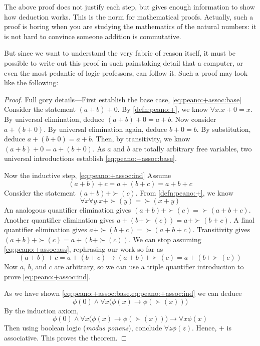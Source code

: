 \documentclass{scrbook}
\renewcommand{\implies}{\to}
\begin{document}
The above proof does not justify each step, but gives enough information to show how deduction works. This is the norm for mathematical proofs. Actually, such a proof is boring when you are studying the mathematics of the natural numbers: it is not hard to convince someone addition is commutative. 

But since we want to understand the very fabric of reason itself, it must be possible to write out this proof in such painstaking detail that a computer, or even the most pedantic of logic professors, can follow it. Such a proof may look like the following: 

\begin{proof}
  Full gory details---First establish the base case, \cref{eq:peano:+assoc:base}
  Consider the statement $(a+b)+0$. By \cref{defn:peano:+}, we know $\forall x . x+0=x$. By universal elimination, deduce $(a+b)+0=a+b$. Now consider
  $a+(b+0)$. By universal elimination again, deduce $b+0=b$. By substitution, deduce $a+(b+0)=a+b$. Then, by transitivity, we know $(a+b)+0=a+(b+0)$. As $a$ and $b$ are totally arbitrary free variables, two universal introductions establish \cref{eq:peano:+assoc:base}.

  Now the inductive step, \cref{eq:peano:+assoc:ind}
  Assume \begin{equation}(a+b)+c=a+(b+c)=a+b+c\label{eq:peano:+assoc:ass}\end{equation}
  Consider the statement $(a+b)+\succ (c)$. From \cref{defn:peano:+}, we know
  \[\forall x \forall y . x+\succ(y)=\succ(x+y)\]
  An analogous quantifier elimination gives $(a+b)+\succ (c) = \succ(a+b+c)$. 
  Another quantifier elimination gives $a+(b+\succ(c))= a+\succ(b+c)$. A final quantifier elimination gives $a+\succ(b+c)=\succ(a+b+c)$. Transitivity gives $(a+b)+\succ(c)=a+(b+\succ(c))$. We can stop assuming \cref{eq:peano:+assoc:ass}, rephrasing our work so far as
  \[
  (a+b)+c=a+(b+c)\implies (a+b)+\succ(c) = a+(b+\succ (c))
  \]
  Now $a$, $b$, and $c$ are arbitrary, so we can use a triple quantifier introduction to prove \cref{eq:peano:+assoc:ind}. 

  As we have shown \cref{eq:peano:+assoc:base,eq:peano:+assoc:ind} we can deduce 
  \begin{equation}
    \label{eq:peano:+assoc:both}
    \phi(0)\wedge \forall x \bigl(\phi(x)\implies \phi(\succ(x))\bigr)
  \end{equation}
  By the induction axiom, 
  \[
  \phi(0)\wedge \forall x \bigl(\phi(x)\implies \phi(\succ(x))\bigr) \implies \forall x \phi(x)
  \]
  Then using boolean logic (\emph{modus ponens}), conclude $\forall z \phi(z)$. Hence, $+$ is associative. This proves the theorem. 
\end{proof}
\end{document}
